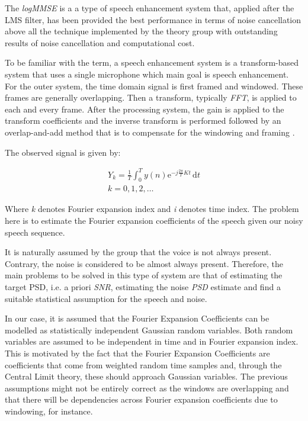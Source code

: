 \documentclass[11pt,a4paper,english]{book}  %
\theoremstyle{definition}  %
\theoremstyle{plain}  %
\theoremstyle{remark}  %
\begin{document}
The \textit{logMMSE} is a a type of speech enhancement system that, applied after the LMS filter, has been provided the best performance in terms of noise cancellation above all the technique implemented by the theory group with outstanding results of noise cancellation and computational cost.
	
	To be familiar with the term, a speech enhancement system is a transform-based system that uses a single microphone which main goal is speech enhancement. For the outer system, the time domain signal is first framed and windowed.  These frames are generally overlapping. Then a transform, typically \textit{FFT}, is applied to each and every frame. After the processing system, the gain is applied to the transform coefficients and the inverse transform is performed followed by an overlap-and-add method that is to compensate for the windowing and framing \cite{speech}.

	
	The observed signal is given by:

	\begin{subequations}
	\label{eq:speech1}
	\begin{align}
	Y_{k}=\frac{1}{T} \int_0^T y(n) \mathrm{e}^{-j \frac{2\pi}{T} Kt}\,\mathrm{d}t\\
	k=0, 1, 2, \dots	
	\end{align}
	
	\end{subequations}
	
	
	Where \textit{k} denotes Fourier expansion index and \textit{i} denotes time index. The problem here is to estimate the Fourier expansion coefficients of the speech given our noisy speech sequence.

It is naturally assumed by the group that the voice is not always present. Contrary, the noise is considered to be almost always present. Therefore, the main problems to be solved in this type of system are that of estimating the target PSD, i.e. a priori \textit{SNR}, estimating the noise \textit{PSD} estimate and find a suitable statistical assumption for the speech and noise.


In our case, it is assumed that the Fourier Expansion Coefficients can be modelled as statistically independent Gaussian random variables. Both random variables are assumed to be independent in time and in Fourier expansion index. This is motivated by the fact that the Fourier Expansion Coefficients are coefficients that come from weighted random time samples and, through the Central Limit theory, these should approach Gaussian variables. The previous assumptions might not be entirely correct as the windows are overlapping and that there will be dependencies across Fourier expansion coefficients due to windowing, for instance.
\end{document}
